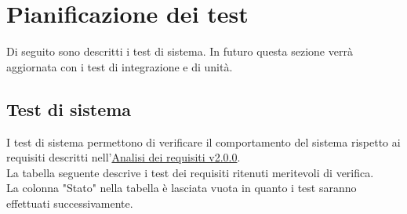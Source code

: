 \documentclass{scalatekids-article}
\begin{document}
\section{Pianificazione dei test}
Di seguito sono descritti i test di sistema. In futuro questa sezione verrà aggiornata con i test di integrazione e di unità.
\subsection{Test di sistema}
I test di sistema permettono di verificare il comportamento del sistema rispetto ai requisiti descritti nell'\href{run:./AnalisiDeiRequisiti\_v2.0.0.pdf}{Analisi dei requisiti v2.0.0}.\\
La tabella seguente descrive i test dei requisiti ritenuti meritevoli di verifica. \\
La colonna "Stato" nella tabella è lasciata vuota in quanto i test saranno effettuati successivamente.
\end{document}
